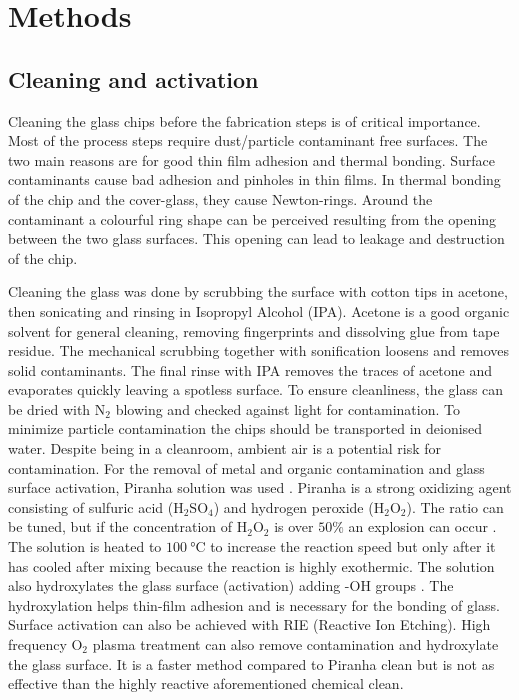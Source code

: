 \documentclass[final]{jyflluk}
\begin{document}
\section{Methods}
\label{sec:methods}

\subsection{Cleaning and activation}
\label{sec:xx1}

Cleaning the glass chips before the fabrication steps is of critical importance. Most of the process steps require dust/particle contaminant free surfaces. The two main reasons are for good thin film adhesion and thermal bonding. Surface contaminants cause bad adhesion and pinholes in thin films. In thermal bonding of the chip and the cover-glass, they cause Newton-rings. Around the contaminant a colourful ring shape can be perceived resulting from the opening between the two glass surfaces. This opening can lead to leakage and destruction of the chip.

Cleaning the glass was done by scrubbing the surface with cotton tips in acetone, then sonicating and rinsing in Isopropyl Alcohol (IPA). Acetone is a good organic solvent for general cleaning, removing fingerprints and dissolving glue from tape residue. The mechanical scrubbing together with sonification loosens and removes solid contaminants. The final rinse with IPA removes the traces of acetone and evaporates quickly leaving a spotless surface. To ensure cleanliness, the glass can be dried with $\mathrm{N_2}$ blowing and checked against light for contamination.  To minimize particle contamination the chips should be transported in deionised water. Despite being in a cleanroom, ambient air is a potential risk for contamination. 
For the removal of metal and organic contamination and glass surface activation, Piranha solution was used \cite{franssila2010introduction}. Piranha is a strong oxidizing agent consisting of sulfuric acid ($\mathrm{H_2 SO_4}$) and hydrogen peroxide ($\mathrm{H_2 O_2}$). The ratio can be tuned, but if the concentration of $\mathrm{H_2 O_2}$ is over $50 \percent$ an explosion can occur \cite{piranha2014}. The solution is heated to $\SI{100}{\celsius}$ to increase the reaction speed but only after it has cooled after mixing because the reaction is highly exothermic. The solution also hydroxylates the glass surface (activation) adding -OH groups \cite{klug2013chemical}. The hydroxylation helps thin-film adhesion and is necessary for the bonding of glass. Surface activation can also be achieved with RIE (Reactive Ion Etching)\cite{lazauskas2012float}. High frequency $\mathrm{O_2}$ plasma treatment can also remove contamination and  hydroxylate the glass surface. It is a faster method compared to Piranha clean but is not as effective than the highly reactive aforementioned chemical clean.
\end{document}
